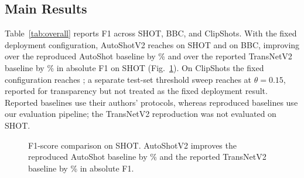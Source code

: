 \subsection{Main Results}

Table~\ref{tab:overall} reports F1 across SHOT, BBC, and ClipShots. With the
fixed deployment configuration, AutoShotV2 reaches
\PaperDeployShotFOne{} on SHOT and \PaperDeployBBCFOne{} on BBC, improving
over the reproduced AutoShot baseline by \PaperDeployVsAutoShotPP\% and
over the reported TransNetV2 baseline by \PaperDeployVsTransNetPP\% in
absolute F1 on SHOT (Fig.~\ref{fig:bars}). On
ClipShots the fixed configuration reaches \PaperDeployClipFOne{}; a separate
test-set threshold sweep reaches \PaperDeployClipBestFOne{} at
$\theta=0.15$, reported for transparency but not treated as the fixed
deployment result. Reported baselines use their authors' protocols, whereas
reproduced baselines use our evaluation pipeline; the TransNetV2
reproduction was not evaluated on SHOT.

\begin{table}[!t]
\caption{F1-Score Comparison Across Evaluation Datasets}
\label{tab:overall}
\centering
\small
\renewcommand{\arraystretch}{1.08}
\end{table}

\begin{figure}[!t]
\centering
{}
\caption{F1-score comparison on SHOT. AutoShotV2 improves the reproduced
AutoShot baseline by \PaperDeployVsAutoShotPP\% and the reported
TransNetV2 baseline by \PaperDeployVsTransNetPP\% in absolute F1.}
\label{fig:bars}
\end{figure}

